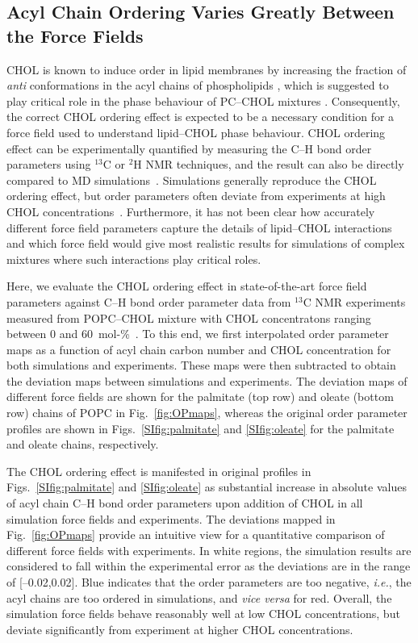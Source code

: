 \documentclass[journal=jctcce]{achemso}
\begin{document}
\subsection{Acyl Chain Ordering Varies Greatly Between the Force Fields}

CHOL is known to induce order in lipid membranes by increasing the fraction of \textit{anti} conformations in the acyl chains of phospholipids \cite{ferreira13}, which is suggested to play critical role in the phase behaviour of PC--CHOL mixtures \cite{ipsen87}. Consequently, the correct CHOL ordering effect is expected to be a necessary condition for a force field used to understand lipid--CHOL phase behaviour. CHOL ordering effect can be experimentally quantified by measuring the C--H bond order parameters using $^{13}$C or $^{2}$H NMR techniques, and the result can also be directly compared to MD simulations~\cite{ollila16}. Simulations generally reproduce the CHOL ordering effect, but order parameters often deviate from experiments at high CHOL concentrations~\cite{ferreira13,madej15}. Furthermore, it has not been clear how accurately different force field parameters capture the details of lipid--CHOL interactions and which force field would give most realistic results for simulations of complex mixtures where such interactions play critical roles. 

Here, we evaluate the CHOL ordering effect in state-of-the-art force field parameters against C--H bond order parameter data from $^{13}$C NMR experiments measured from POPC--CHOL mixture with CHOL concentratons ranging between 0 and 60~mol-\%~\cite{ferreira13}. To this end, we first interpolated order parameter maps as a function of acyl chain carbon number and CHOL concentration for both simulations and experiments. These maps were then subtracted to obtain the deviation maps between simulations and experiments. The deviation maps of different force fields are shown for the palmitate (top row) and oleate (bottom row) chains of POPC in Fig.~\ref{fig:OPmaps}, whereas the original order parameter profiles are shown in Figs.~\ref{SIfig:palmitate} and \ref{SIfig:oleate} for the palmitate and oleate chains, respectively.

The CHOL ordering effect is manifested in original profiles in Figs.~\ref{SIfig:palmitate} and \ref{SIfig:oleate} as substantial increase in absolute values of acyl chain C--H bond order parameters upon addition of CHOL in all simulation force fields and experiments. The deviations mapped in Fig.~\ref{fig:OPmaps} provide an intuitive view for a quantitative comparison of different force fields with experiments. In white regions, the simulation results are considered to fall within the experimental error as the deviations are in the range of [--0.02,0.02]. Blue indicates that the order parameters are too negative, \textit{i.e.}, the acyl chains are too ordered in simulations, and \textit{vice versa} for red. Overall, the simulation force fields behave reasonably well at low CHOL concentrations, but deviate significantly from experiment at higher CHOL concentrations. 
\end{document}
